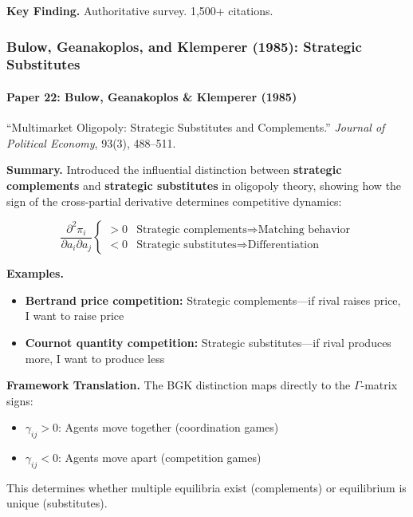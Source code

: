 \textbf{Key Finding.}
Authoritative survey. 1,500+ citations.

\subsubsection{Bulow, Geanakoplos, and Klemperer (1985): Strategic Substitutes}

\paragraph{Paper 22: Bulow, Geanakoplos \& Klemperer (1985)}

``Multimarket Oligopoly: Strategic Substitutes and Complements.''
\textit{Journal of Political Economy}, 93(3), 488--511.

\textbf{Summary.}
Introduced the influential distinction between \textbf{strategic complements}
and \textbf{strategic substitutes} in oligopoly theory, showing how the sign
of the cross-partial derivative determines competitive dynamics:

\begin{equation}
\frac{\partial^2 \pi_i}{\partial a_i \partial a_j}
\begin{cases}
> 0 & \text{Strategic complements} \Rightarrow \text{Matching behavior} \\
< 0 & \text{Strategic substitutes} \Rightarrow \text{Differentiation}
\end{cases}
\end{equation}

\textbf{Examples.}
\begin{itemize}
    \item \textbf{Bertrand price competition:} Strategic complements---if rival
          raises price, I want to raise price
    \item \textbf{Cournot quantity competition:} Strategic substitutes---if rival
          produces more, I want to produce less
\end{itemize}

\textbf{Framework Translation.}
The BGK distinction maps directly to the $\Gamma$-matrix signs:
\begin{itemize}
    \item $\gamma_{ij} > 0$: Agents move together (coordination games)
    \item $\gamma_{ij} < 0$: Agents move apart (competition games)
\end{itemize}

This determines whether multiple equilibria exist (complements) or equilibrium
is unique (substitutes).

